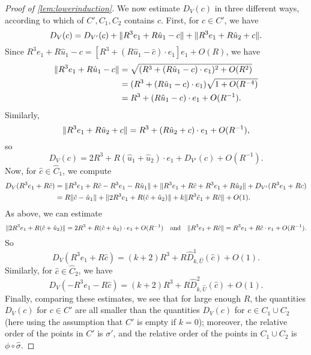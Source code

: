 \documentclass[11pt]{amsart}
\theoremstyle{definition}
\DeclarePairedDelimiter{\Abs}{\lVert}{\rVert}
\begin{document}
\begin{proof}[Proof of \cref{lem:lowerinduction}]
We now estimate $D_V(c)$ in three different ways, according to which of $C', C_1, C_2$ contains $c$.  First, for $c \in C'$, we have
\[D_{V}(c) = D_{V'}(c) + \Abs{R^3e_1 + R\hat u_1 - c} + \Abs{R^3 e_1 + R\hat u_2 + c}.\]
Since $R^3 e_1 + R\hat u_1 - c=[R^3 + (R\hat u_1-\hat c) \cdot e_1]e_1+O(R)$, we have
\begin{align*}\Abs{R^3e_1 + R\hat u_1 - c} &= \sqrt{(R^3 + (R\hat u_1-c) \cdot e_1)^2 + O(R^2)} \\ &= (R^3 + (R\hat u_1-c) \cdot e_1)\sqrt{1 + O(R^{-4})} \\ &= R^3 + (R\hat u_1-c) \cdot e_1 + O(R^{-1}).
\end{align*}
Similarly,
\[\Abs{R^3 e_1 + R\hat u_2 + c} = R^3 + (R\hat u_2 + c)\cdot e_1 + O(R^{-1}),\]
so
\[
D_{V}(c) = 2R^3 + R(\hat u_1 + \hat u_2) \cdot e_1 + D_{V'}(c) + O(R^{-1}).
\]
Now, for $\hat c \in \hat C_1$, we compute
\begin{align*}
D_{V}(R^3e_1 + R\hat c) &= \Abs{R^3 e_1 + R\hat c - R^3e_1 - R\hat u_1} + \Abs{R^3 e_1 + R\hat c + R^3 e_1 + R\hat u_2} + D_{V'}(R^3e_1 + Rc) \\
&= R\Abs{ \hat c - \hat u_1} + \Abs{2R^3 e_1 + R(\hat c + \hat u_2)} + k\Abs{R^3 \hat e_1 + R\hat c} + O(1).
\end{align*}
As above, we can estimate \[\Abs{2R^3e_1 + R(\hat c + \hat u_2)}=2R^3 + R(\hat c + \hat u_2) \cdot e_1 + O(R^{-1})\quad\text{and}\quad\Abs{R^3 e_1 + R\hat c} = R^3 e_1 + R\hat c \cdot e_1 + O(R^{-1}).\]  So
\[
D_{V}(R^3e_1 + R\hat c) = (k+2)R^3 + R\hat D^1_{k,\hat U}(\hat c) + O(1).
\]
Similarly, for $\hat c \in \hat C_2$, we have
\[
D_{V}(-R^3e_1 - R\hat c) = (k+2)R^3 + R\hat D^2_{k,\hat U}(\hat c) + O(1).
\]
Finally, comparing these estimates, we see that for large enough $R$, the quantities $D_V(c)$ for $c \in C'$ are all smaller than the quantities $D_V(c)$ for $c \in C_1 \cup C_2$ (here using the assumption that $C'$ is empty if $k=0$); moreover, the relative order of the points in $C'$ is $\sigma'$, and the relative order of the points in $C_1 \cup C_2$ is $\phi \circ \hat \sigma$.
\end{proof}
\end{document}
